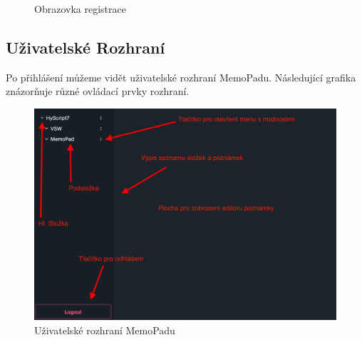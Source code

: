 \begin{figure}[h]
\begin{minipage}[t]{0.45\textwidth}
\begin{center}
            \caption{Obrazovka registrace}
            \label{fig:registerscreen}
        \end{center}
    \end{minipage}
\end{figure}

\subsection{Uživatelské Rozhraní}

Po přihlášení můžeme vidět uživatelské rozhraní MemoPadu. Následující grafika znázorňuje různé ovládací prvky rozhraní.

\begin{figure}[h]
    \begin{center}
        \includegraphics[width=0.5\linewidth]{graphics/ui.png}
        \caption{Uživatelské rozhraní MemoPadu}
        \label{fig:ui}
    \end{center}
\end{figure}
